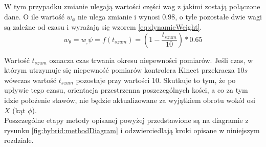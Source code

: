 W tym przypadku zmianie ulegają wartości części wag z jakimi zostają połączone dane. O ile wartość $w_\phi$ nie ulega zmianie i wynosi $0.98$, o tyle pozostałe dwie wagi są zależne od czasu i wyrażają się wzorem \ref{eq:dynamicWeight}.
\begin{equation}
	w_{\theta} = w_,\psi = f(t_{szum}) = (1-\frac{t_{szum}}{10}) * 0.65
	\label{eq:dynamicWeight}
\end{equation}

Wartość $t_{szum}$ oznacza czas trwania okresu niepewności pomiarów. Jeśli czas, w którym utrzymuje się niepewność pomiarów kontrolera Kinect przekracza $10s$ wówczas wartość $t_{szum}$ pozostaje przy wartości $10$. Skutkuje to tym, że po upływie tego czasu, orientacja przestrzenna poszczególnych kości, a co za tym idzie położenie stawów, nie będzie aktualizowane za wyjątkiem obrotu wokół osi $X$ (kąt $\phi$). \\


Poszczególne etapy metody opisanej powyżej przedstawione są na diagramie z rysunku \ref{fig:hybrid:methodDiagram} i odzwierciedlają kroki opisane w niniejszym rozdziale.